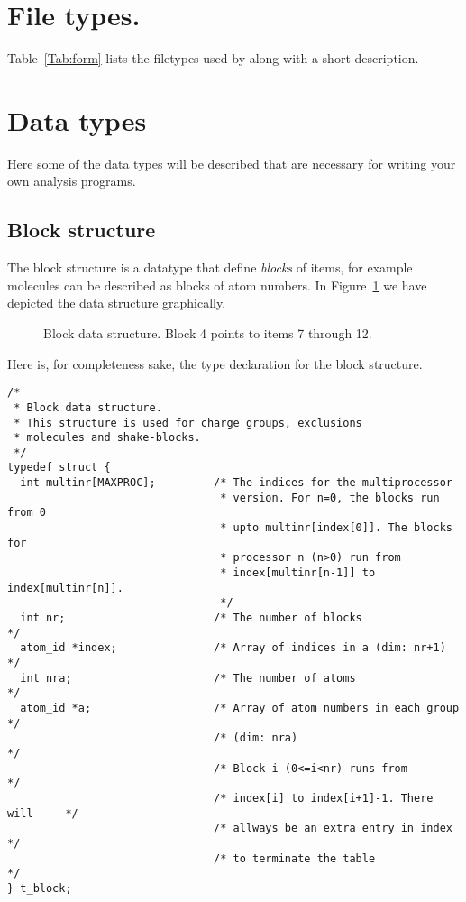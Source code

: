 \section{File types.}
\label{sec:fileformats}
Table~\ref{Tab:form} lists the filetypes used by {\gromacs} along with
a short description.


\section{Data types}
Here some of the data types will be described that are necessary for writing
your own analysis programs.

\subsection{Block structure}
The block structure is a datatype that define {\em blocks} of items,
for example molecules can be described as blocks of atom numbers.
In Figure~\ref{fig:block} we have depicted the data structure graphically.
\begin{figure}
\centerline{}
\caption{Block data structure. Block 4 points to items 7 through 12.}
\label{fig:block}
\end{figure}

Here is, for completeness sake,
the type declaration for the block structure.
\begin{verbatim}
/*
 * Block data structure.
 * This structure is used for charge groups, exclusions
 * molecules and shake-blocks.
 */
typedef struct {
  int multinr[MAXPROC];         /* The indices for the multiprocessor 
                                 * version. For n=0, the blocks run from 0
                                 * upto multinr[index[0]]. The blocks for 
                                 * processor n (n>0) run from 
                                 * index[multinr[n-1]] to index[multinr[n]].
                                 */
  int nr;                       /* The number of blocks                     */
  atom_id *index;               /* Array of indices in a (dim: nr+1)        */
  int nra;                      /* The number of atoms                      */
  atom_id *a;                   /* Array of atom numbers in each group      */
                                /* (dim: nra)                               */
                                /* Block i (0<=i<nr) runs from              */
                                /* index[i] to index[i+1]-1. There will     */
                                /* allways be an extra entry in index       */
                                /* to terminate the table                   */
} t_block;
\end{verbatim}



